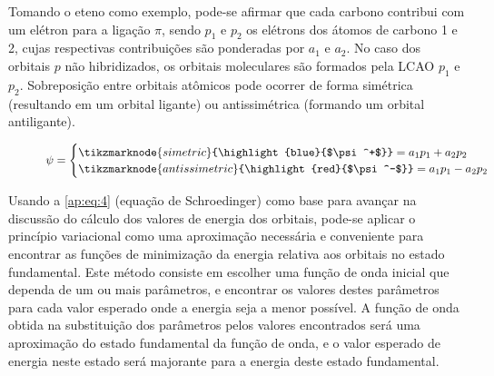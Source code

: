 Tomando o eteno como exemplo, pode-se afirmar que cada carbono contribui com um elétron para a ligação $\pi$, sendo $p_1$ e $p_2$ os elétrons dos átomos de carbono 1 e 2, cujas respectivas contribuições são ponderadas por $a_1$ e $a_2$. No caso dos orbitais $p$ não hibridizados, os orbitais moleculares são formados pela \gls{LCAO} $p_1$ e $p_2$. Sobreposição entre orbitais atômicos pode ocorrer de forma simétrica (resultando em um orbital ligante) ou antissimétrica (formando um orbital antiligante).

\begin{figure}[htb]
    \vspace{2\baselineskip}
\begin{equation}
    \label{ap:eq:3}
    \psi =
    \begin{cases}
\tikzmarknode{simetric}{\highlight{blue}{$\psi^+$}} = a_1 p_1 + a_2 p_2 \\
\tikzmarknode{antissimetric}{\highlight{red}{$\psi^-$}} = a_1 p_1 - a_2 p_2
    \end{cases}
\end{equation}
    \vspace{1\baselineskip}
\end{figure}

Usando a \autoref{ap:eq:4} (equação de Schroedinger) como base para avançar na discussão do cálculo dos valores de energia dos orbitais, pode-se aplicar o princípio variacional como uma aproximação necessária e conveniente para encontrar as funções de minimização da energia relativa aos orbitais no estado fundamental. Este método consiste em escolher uma função de onda inicial que dependa de um ou mais parâmetros, e encontrar os valores destes parâmetros para cada valor esperado onde a energia seja a menor possível. A função de onda obtida na substituição dos parâmetros pelos valores encontrados será uma aproximação do estado fundamental da função de onda, e o valor esperado de energia neste estado será majorante para a energia deste estado fundamental.

